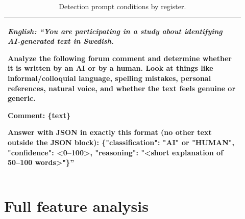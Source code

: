 \documentclass[thesis]{cluu}
\begin{document}
\begin{table}[h!]
\begin{tabular}{p{0.92\linewidth}}
{\itshape\footnotesize English: ``You are participating in a study about identifying
AI-generated text in Swedish.

Analyze the following forum comment and determine whether it is written by an AI
or by a human. Look at things like informal/colloquial language, spelling
mistakes, personal references, natural voice, and whether the text feels genuine
or generic.

Comment: \{text\}

Answer with JSON in exactly this format (no other text outside the JSON block):
\{"classification": "AI" or "HUMAN", "confidence": \textless 0--100\textgreater,
"reasoning": "\textless short explanation of 50--100 words\textgreater"\}''\par} \\
\bottomrule
\end{tabular}
\caption{Detection prompt conditions by register.}
\label{tab:detection-prompt-conditions}
\end{table}

\newpage


\section{Full feature analysis}
\end{document}
